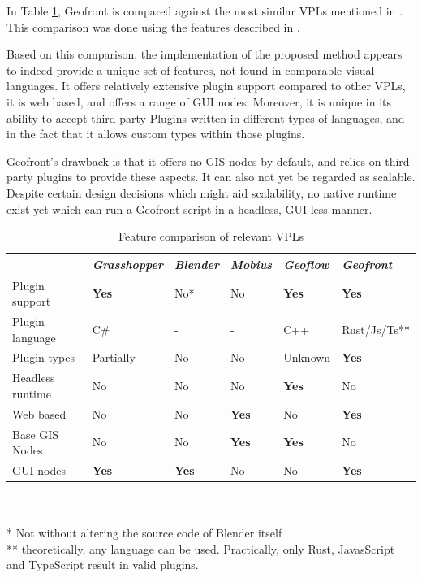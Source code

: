 In Table \ref{table:features}, Geofront is compared against the most similar \ac{VPL}s mentioned in .
This comparison was done using the features described in .

Based on this comparison, the implementation of the proposed method appears to indeed provide a unique set of features, not found in comparable visual languages. 
It offers relatively extensive plugin support compared to other VPLs, it is web based, and offers a range of \ac{GUI} nodes. 
Moreover, it is unique in its ability to accept third party Plugins written in different types of languages, and in the fact that it allows custom types within those plugins. 

Geofront's drawback is that it offers no GIS nodes by default, and relies on third party plugins to provide these aspects. 
It can also not yet be regarded as scalable. 
Despite certain design decisions which might aid scalability, no native runtime exist yet which can run a Geofront script in a headless, GUI-less manner.

\begin{table}[h]
\centering
\footnotesize{
\begin{tabular}{
||p{2.8cm}|l|l|l|l|l||}
\hline
& \emph{Grasshopper} & \emph{Blender} & \emph{Mobius} & \emph{Geoflow}    & \emph{Geofront}   \\
\hline
Plugin support    & \textbf{Yes}  & No*    & No     & \textbf{Yes} & \textbf{Yes} \\
Plugin language   & C\#  & -    & -     & C++ & Rust/Js/Ts** \\
Plugin types      & Partially & No      & No     & Unknown    & \textbf{Yes} \\
Headless runtime  & No          & No      & No               & \textbf{Yes} & No         \\
Web based         & No          & No      & \textbf{Yes}     & No           & \textbf{Yes} \\
Base GIS Nodes    & No          & No      & \textbf{Yes}     & \textbf{Yes} & No \\
GUI nodes         & \textbf{Yes} & \textbf{Yes}      & No     & No          & \textbf{Yes} \\
\hline
\end{tabular}
}
\\
--- \\
\footnotesize{* Not without altering the source code of Blender itself \\}
\footnotesize{** theoretically, any language can  be used. 
Practically, only Rust, JavasScript and TypeScript result in valid plugins. \\}

\caption{Feature comparison of relevant VPLs}
\label{table:features}
\end{table}


